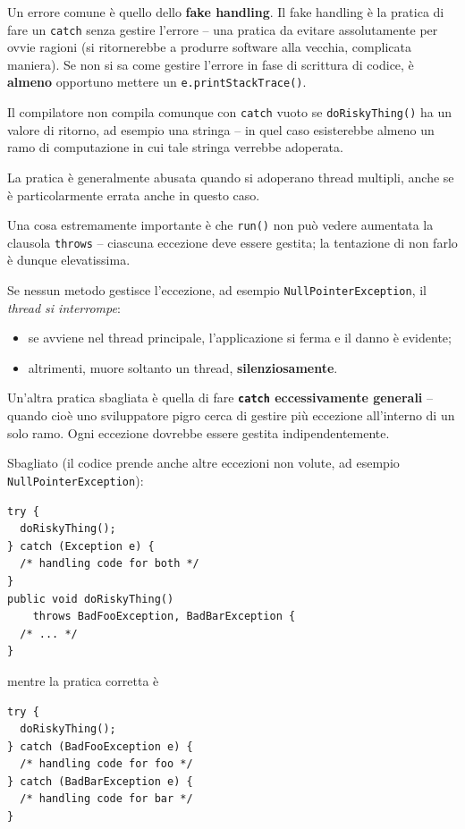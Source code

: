\documentclass[\fontsizeclass,twocolumn]{\classname}
\theoremstyle{definition}
\theoremstyle{definition}
\begin{document}
Un errore comune è quello dello \textbf{fake handling}. Il fake handling è la
pratica di fare un \texttt{catch} senza gestire l'errore -- una pratica da
evitare assolutamente per ovvie ragioni (si ritornerebbe a produrre software
alla vecchia, complicata maniera). Se non si sa come gestire l'errore in fase
di scrittura di codice, è \textbf{almeno} opportuno mettere un
\texttt{e.printStackTrace()}.

Il compilatore non compila comunque con \texttt{catch} vuoto se
\texttt{doRiskyThing()} ha un valore di ritorno, ad esempio una stringa -- in
quel caso esisterebbe almeno un ramo di computazione in cui tale stringa
verrebbe adoperata.

La pratica è generalmente abusata quando si adoperano thread multipli, anche se
è particolarmente errata anche in questo caso.

Una cosa estremamente importante è che \texttt{run()} non può vedere aumentata
la clausola \texttt{throws} -- ciascuna eccezione deve essere gestita; la
tentazione di non farlo è dunque elevatissima.

Se nessun metodo gestisce l'eccezione, ad esempio
\texttt{NullPointer\-Exception}, il \emph{thread si interrompe}:
\begin{itemize}
    \item se avviene nel thread principale, l'applicazione si ferma e il danno
        è evidente;
    \item altrimenti, muore soltanto un thread, \textbf{silenziosamente}.
\end{itemize}

Un'altra pratica sbagliata è quella di fare \textbf{\texttt{catch}
eccessivamente generali} -- quando cioè uno sviluppatore pigro cerca di gestire
più eccezione all'interno di un solo ramo. Ogni eccezione dovrebbe essere
gestita indipendentemente.

Sbagliato (il codice prende anche altre eccezioni non volute, ad esempio
\texttt{NullPointer\-Exception}):

\begin{lstlisting}
try {
  doRiskyThing();
} catch (Exception e) {
  /* handling code for both */
}
public void doRiskyThing()
    throws BadFooException, BadBarException {
  /* ... */
}
\end{lstlisting}

mentre la pratica corretta è

\begin{lstlisting}
try {
  doRiskyThing();
} catch (BadFooException e) {
  /* handling code for foo */
} catch (BadBarException e) {
  /* handling code for bar */
}
\end{lstlisting}
\end{document}
